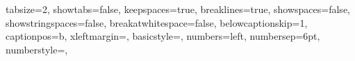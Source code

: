 
 {
  tabsize=2,
	showtabs=false,
	keepspaces=true,
  breaklines=true,
  showspaces=false,
  showstringspaces=false,
	breakatwhitespace=false,
  belowcaptionskip=1\baselineskip,
	captionpos=b,
  xleftmargin=\parindent,
	basicstyle=\ttfamily\footnotesize,
  numbers=left,
  numbersep=6pt,
	numberstyle=\tiny\color{lavenderindigo},
}